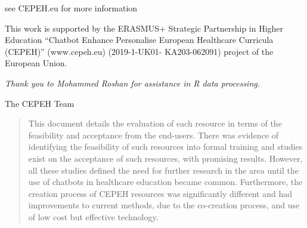 \documentclass[a4paper, nobind]{templates/ociamthesis}
\begin{document}

\begin{romanpages}

\maketitle

\begin{dedication}
  see CEPEH.eu for more information
\end{dedication}



\begin{acknowledgements}
 	This work is supported by the ERASMUS+ Strategic Partnership in Higher Education ``Chatbot Enhance Personalise European Healthcare Curricula (CEPEH)'' (www.cepeh.eu) (2019-1-UK01- KA203-062091) project of the European Union.

 \emph{Thank you to Mohammed Roshan for assistance in R data processing.}

 \begin{flushright}
 The CEPEH Team \\
 \end{flushright}
\end{acknowledgements}





\renewcommand{\abstracttitle}{Abstract}
\begin{abstract}
	This document details the evaluation of each resource in terms of the feasibility and acceptance from the end-users. There was evidence of identifying the feasibility of such resources into formal training and studies exist on the acceptance of such resources, with promising results. However, all these studies defined the need for further research in the area until the use of chatbots in healthcare education became common. Furthermore, the creation process of CEPEH resources was significantly different and had improvements to current methods, due to the co-creation process, and use of low cost but effective technology.
\end{abstract}




\end{romanpages}
\end{document}
